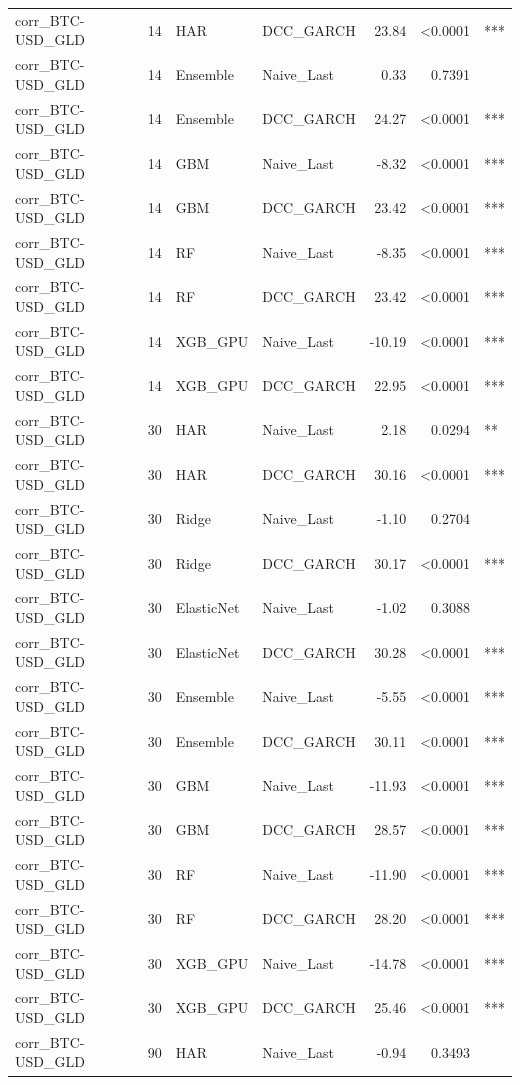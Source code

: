 \begin{table}[H]
\begin{tabular}{llllrrl}
corr_BTC-USD_GLD & 14 & HAR & DCC_GARCH & 23.84 & <0.0001 & *** \\
corr_BTC-USD_GLD & 14 & Ensemble & Naive_Last & 0.33 & 0.7391 &  \\
corr_BTC-USD_GLD & 14 & Ensemble & DCC_GARCH & 24.27 & <0.0001 & *** \\
corr_BTC-USD_GLD & 14 & GBM & Naive_Last & -8.32 & <0.0001 & *** \\
corr_BTC-USD_GLD & 14 & GBM & DCC_GARCH & 23.42 & <0.0001 & *** \\
corr_BTC-USD_GLD & 14 & RF & Naive_Last & -8.35 & <0.0001 & *** \\
corr_BTC-USD_GLD & 14 & RF & DCC_GARCH & 23.42 & <0.0001 & *** \\
corr_BTC-USD_GLD & 14 & XGB_GPU & Naive_Last & -10.19 & <0.0001 & *** \\
corr_BTC-USD_GLD & 14 & XGB_GPU & DCC_GARCH & 22.95 & <0.0001 & *** \\
corr_BTC-USD_GLD & 30 & HAR & Naive_Last & 2.18 & 0.0294 & ** \\
corr_BTC-USD_GLD & 30 & HAR & DCC_GARCH & 30.16 & <0.0001 & *** \\
corr_BTC-USD_GLD & 30 & Ridge & Naive_Last & -1.10 & 0.2704 &  \\
corr_BTC-USD_GLD & 30 & Ridge & DCC_GARCH & 30.17 & <0.0001 & *** \\
corr_BTC-USD_GLD & 30 & ElasticNet & Naive_Last & -1.02 & 0.3088 &  \\
corr_BTC-USD_GLD & 30 & ElasticNet & DCC_GARCH & 30.28 & <0.0001 & *** \\
corr_BTC-USD_GLD & 30 & Ensemble & Naive_Last & -5.55 & <0.0001 & *** \\
corr_BTC-USD_GLD & 30 & Ensemble & DCC_GARCH & 30.11 & <0.0001 & *** \\
corr_BTC-USD_GLD & 30 & GBM & Naive_Last & -11.93 & <0.0001 & *** \\
corr_BTC-USD_GLD & 30 & GBM & DCC_GARCH & 28.57 & <0.0001 & *** \\
corr_BTC-USD_GLD & 30 & RF & Naive_Last & -11.90 & <0.0001 & *** \\
corr_BTC-USD_GLD & 30 & RF & DCC_GARCH & 28.20 & <0.0001 & *** \\
corr_BTC-USD_GLD & 30 & XGB_GPU & Naive_Last & -14.78 & <0.0001 & *** \\
corr_BTC-USD_GLD & 30 & XGB_GPU & DCC_GARCH & 25.46 & <0.0001 & *** \\
corr_BTC-USD_GLD & 90 & HAR & Naive_Last & -0.94 & 0.3493 &  \\

\end{tabular}
\end{table}
